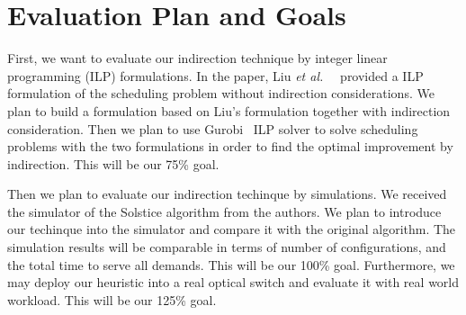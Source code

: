 \section{Evaluation Plan and Goals}
\label{sec:goal}
First, we want to evaluate our indirection technique by integer
linear programming (ILP) formulations. In the paper, Liu \textit{et al.\ }~\cite{Liu:2015}
provided a ILP formulation of the scheduling problem without indirection
considerations. We plan to build a formulation based on Liu's formulation
together with indirection consideration. Then we plan to use Gurobi~\cite{gurobi}
ILP solver to solve scheduling problems with the two formulations in order
to find the optimal improvement by indirection. This will be our 75\%
goal.

Then we plan to evaluate our indirection techinque by simulations. We received the
simulator of the Solstice algorithm from the authors. We plan to introduce
our techinque into the simulator and compare it with the original algorithm.
The simulation results will be comparable in terms of number of configurations,
and the total time to serve all demands. This will be our 100\% goal.
Furthermore, we may deploy our heuristic into a real optical switch and evaluate it with real world
workload. This will be our 125\% goal.

